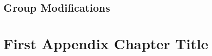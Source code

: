 \documentclass[a4paper, oneside]{discothesis}
\begin{document}
\section{Group Modifications}




\appendix
\chapter{First Appendix Chapter Title}
\end{document}
